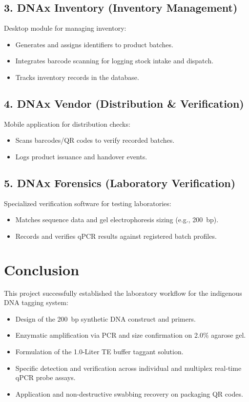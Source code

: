 \subsection{3. DNAx Inventory (Inventory Management)}
Desktop module for managing inventory:
\begin{itemize}
    \item Generates and assigns identifiers to product batches.
    \item Integrates barcode scanning for logging stock intake and dispatch.
    \item Tracks inventory records in the database.
\end{itemize}

\subsection{4. DNAx Vendor (Distribution \& Verification)}
Mobile application for distribution checks:
\begin{itemize}
    \item Scans barcodes/QR codes to verify recorded batches.
    \item Logs product issuance and handover events.
\end{itemize}

\subsection{5. DNAx Forensics (Laboratory Verification)}
Specialized verification software for testing laboratories:
\begin{itemize}
    \item Matches sequence data and gel electrophoresis sizing (e.g., 200~bp).
    \item Records and verifies qPCR results against registered batch profiles.
\end{itemize}

\section{Conclusion}
This project successfully established the laboratory workflow for the indigenous DNA tagging system:
\begin{itemize}
    \item Design of the 200~bp synthetic DNA construct and primers.
    \item Enzymatic amplification via PCR and size confirmation on 2.0\% agarose gel.
    \item Formulation of the 1.0-Liter TE buffer taggant solution.
    \item Specific detection and verification across individual and multiplex real-time qPCR probe assays.
    \item Application and non-destructive swabbing recovery on packaging QR codes.
\end{itemize}
